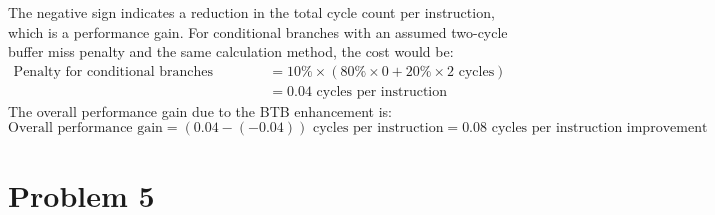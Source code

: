 \documentclass{article}
\begin{document}
The negative sign indicates a reduction in the total cycle count per instruction, which is a performance gain. For conditional branches with an assumed two-cycle buffer miss penalty and the same calculation method, the cost would be:
\[
\begin{aligned}
    \text{Penalty for conditional branches storing target address} &= 10\% \times (80\% \times 0 + 20\% \times 2 \text{ cycles})\\
    &= 0.04 \text{ cycles per instruction}
\end{aligned}
\]
The overall performance gain due to the BTB enhancement is:
\begin{equation*}
    \text{Overall performance gain} = (0.04 - (-0.04)) \text{ cycles per instruction}= 0.08 \text{ cycles per instruction improvement}
\end{equation*}


\newpage
\section{Problem 5}
\end{document}
